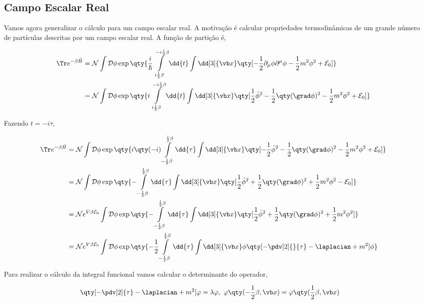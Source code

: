 \documentclass[twoside]{amsart}
\numberwithin{equation}{section}
\newcommand{\Dd}[1]{\mathcal D #1}
\begin{document}
\begin{refsection}
\section{Campo Escalar Real}

Vamos agora generalizar o cálculo para um campo escalar real. A motivação é calcular propriedades termodinâmicas de um grande número de partículas descritas por um campo escalar real. A função de partição é,

\begin{align}
    \Tr e^{-\beta\hat H}&=\mathcal N\int\Dd{\phi}\exp\qty{\frac i\hbar\int\limits_{i\frac12\beta}^{-i\frac12\beta}\dd{t}\int\dd[3]{\vb x}\qty[-\frac12\partial_\mu\phi\partial^\mu\phi-\frac12m^2\phi^2+\mathcal E_0]}\\
    &=\mathcal N\int\Dd{\phi}\exp\qty{i\int\limits_{i\frac12\beta}^{-i\frac12\beta}\dd{t}\int\dd[3]{\vb x}\qty[\frac{1}{2}{\dot\phi}^2-\frac12\qty(\grad\phi)^2-\frac12m^2\phi^2+\mathcal E_0]}
\end{align}

Fazendo $t=-i\tau$,

\begin{align}
    \Tr e^{-\beta\hat H}&=\mathcal N\int\Dd{\phi}\exp\qty{i\qty(-i)\int\limits_{-\frac12\beta}^{\frac12\beta}\dd{\tau}\int\dd[3]{\vb x}\qty[-\frac{1}{2}{\dot\phi}^2-\frac12\qty(\grad\phi)^2-\frac12m^2\phi^2+\mathcal E_0]}\\
    &=\mathcal N\int\Dd{\phi}\exp\qty{-\int\limits_{-\frac12\beta}^{\frac12\beta}\dd{\tau}\int\dd[3]{\vb x}\qty[\frac{1}{2}{\dot\phi}^2+\frac12\qty(\grad\phi)^2+\frac12m^2\phi^2-\mathcal E_0]}\\
    &=\mathcal Ne^{V\beta\mathcal E_0}\int\Dd{\phi}\exp\qty{-\int\limits_{-\frac12\beta}^{\frac12\beta}\dd{\tau}\int\dd[3]{\vb x}\qty[\frac{1}{2}{\dot\phi}^2+\frac12\qty(\grad\phi)^2+\frac12m^2\phi^2]}\\
    &=\mathcal Ne^{V\beta\mathcal E_0}\int\Dd{\phi}\exp\qty{-\frac12\int\limits_{-\frac12\beta}^{\frac12\beta}\dd{\tau}\int\dd[3]{\vb x}\phi\qty[-\pdv[2]{}{\tau}-\laplacian+m^2]\phi}
\end{align}

Para realizar o cálculo da integral funcional vamos calcular o determinante do operador,

\begin{align}
    \qty[-\pdv[2]{\tau}-\laplacian+m^2]\varphi&=\lambda\varphi,\ \varphi\qty(-\frac12\beta,\vb x)=\varphi\qty(\frac12\beta,\vb x)
\end{align}


\end{refsection}
\end{document}
